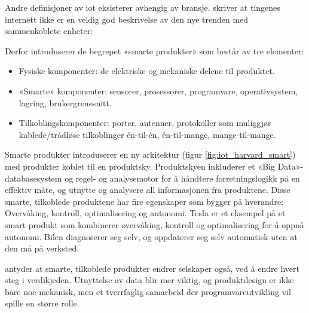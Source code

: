 Andre definisjoner av \gls{iot} eksisterer avhengig av bransje. \citet{iot_harvard_smart} skriver
at tingenes internett ikke er en veldig god beskrivelse av den nye trenden med
sammenkoblete enheter: 

Derfor introduserer de begrepet «smarte produkter» som består av tre elementer:

 \begin{itemize}
    \item Fysiske komponenter: de elektriske og mekaniske delene til produktet.
    \item «Smarte» komponenter: sensorer, prosessorer, programvare, operativsystem, lagring, brukergrenesnitt.
    \item Tilkoblingskomponenter: porter, antenner, protokoller som muliggjør kablede/trådløse tilkoblinger
    én-til-én, én-til-mange, mange-til-mange.
\end{itemize}

Smarte produkter introduserer en ny arkitektur (figur \ref{fig:iot_harvard_smart}) med produkter koblet til
en produktsky. Produktskyen inkluderer et «Big Data»-databasesystem og regel- og analysemotor for å håndtere
forretningslogikk på en effektiv måte, og utnytte og analysere all informasjonen fra produktene.
Disse smarte, tilkoblede produktene har fire egenskaper som bygger på hverandre: Overvåking, kontroll,
optimalisering og autonomi. Tesla er et eksempel på et smart produkt som kombinerer overvåking, kontroll og
optimalisering for å oppnå autonomi. Bilen diagnoserer seg selv, og oppdaterer seg selv automatisk uten
at den må på verksted.

\citet{iot_harvard_smartcompanies} antyder at smarte, tilkoblede produkter endrer selskaper også, ved
å endre hvert steg i verdikjeden. Utnyttelse av data blir mer viktig, og produktdesign er ikke bare noe
mekanisk, men et tverrfaglig samarbeid der programvareutvikling vil spille en større rolle. 

